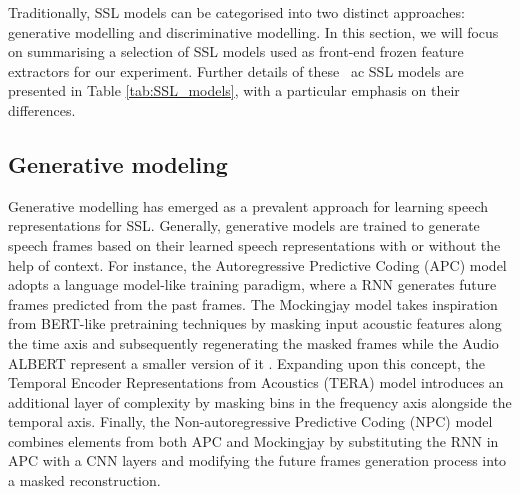 Traditionally, \ac{SSL} models can be categorised into two distinct approaches: generative modelling and discriminative modelling. In this section, we will focus on summarising a selection of \ac{SSL} models used as front-end frozen feature extractors for our experiment. Further details of these \ ac {SSL} models are presented in Table \ref{tab:SSL_models}, with a particular emphasis on their differences.

\subsection{Generative modeling}
Generative modelling has emerged as a prevalent approach for learning speech representations for \ac{SSL}. Generally, generative models are trained to generate speech frames based on their learned speech representations with or without the help of context. For instance, the Autoregressive Predictive Coding (APC) model \cite{chung19_interspeech} adopts a language model-like training paradigm, where a \ac{RNN} generates future frames predicted from the past frames. 
The Mockingjay model \cite{mockingjay} takes inspiration from BERT-like pretraining techniques by masking input acoustic features along the time axis and subsequently regenerating the masked frames while the Audio ALBERT represent a smaller version of it \cite{chi2021audio}. Expanding upon this concept, the Temporal Encoder Representations from Acoustics (TERA) model \cite{liu2021tera} introduces an additional layer of complexity by masking bins in the frequency axis alongside the temporal axis. Finally, the Non-autoregressive Predictive Coding (NPC) model \cite{liu21l_interspeech} combines elements from both APC and Mockingjay by substituting the \ac{RNN} in APC with a \ac{CNN} layers and modifying the future frames generation process into a masked reconstruction.

